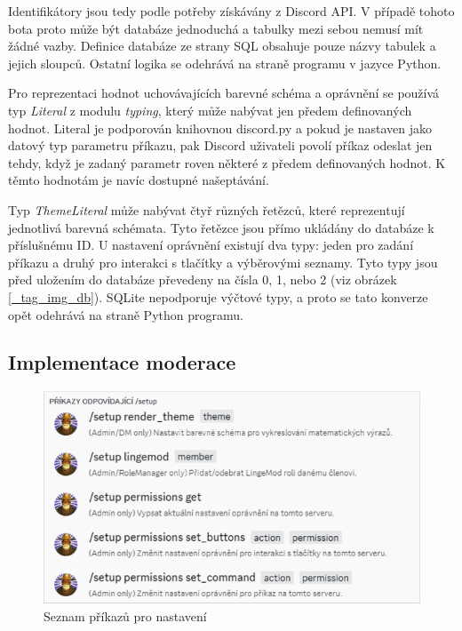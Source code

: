\documentclass[FM]{tulthesis}
\begin{document}
	Identifikátory jsou tedy podle potřeby získávány z Discord API. V případě tohoto bota proto může být databáze jednoduchá a tabulky mezi sebou nemusí mít žádné vazby. Definice databáze ze strany SQL obsahuje pouze názvy tabulek a jejich sloupců. Ostatní logika se odehrává na straně programu v jazyce Python.
	
	Pro reprezentaci hodnot uchovávajících barevné schéma a oprávnění se používá typ \textit{Literal} z modulu \textit{typing}, který může nabývat jen předem definovaných hodnot. Literal je podporován knihovnou discord.py a pokud je nastaven jako datový typ parametru příkazu, pak Discord uživateli povolí příkaz odeslat jen tehdy, když je zadaný parametr roven některé z předem definovaných hodnot. K těmto hodnotám je navíc dostupné našeptávání.
	
	Typ \textit{ThemeLiteral} může nabývat čtyř různých řetězců, které reprezentují jednotlivá barevná schémata. Tyto řetězce jsou přímo ukládány do databáze k příslušnému ID. U nastavení oprávnění existují dva typy: jeden pro zadání příkazu a druhý pro interakci s tlačítky a výběrovými seznamy. Tyto typy jsou před uložením do databáze převedeny na čísla 0, 1, nebo 2 (viz obrázek \ref{_tag_img_db}). SQLite nepodporuje výčtové typy, a proto se tato konverze opět odehrává na straně Python programu.
	
	\subsection{Implementace moderace}
	
	\begin{figure}[ht]
		\centering
		\includegraphics[width=\textwidth]{img/SetupCommands}
		\caption{Seznam příkazů pro nastavení}
	\end{figure}
	
\end{document}
